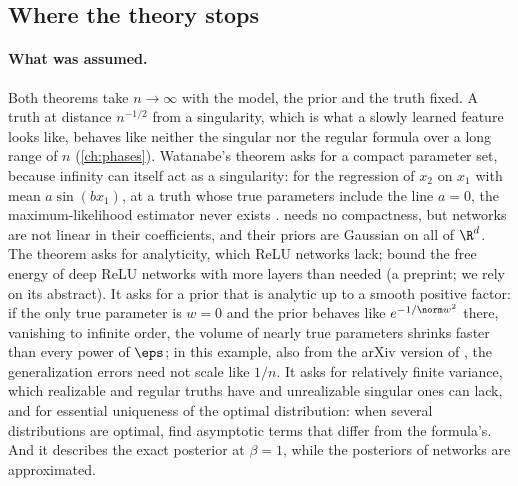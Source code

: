 \begin{refsection}

\section{Where the theory stops}\label{sec:freeenergy:stops}

\paragraph{What was assumed.} Both theorems take $n\to\infty$ with the model, the prior and the truth fixed. A truth at distance $n^{-1/2}$ from a singularity, which is what a slowly learned feature looks like, behaves like neither the singular nor the regular formula over a long range of $n$ (\cref{ch:phases}). Watanabe's theorem asks for a compact parameter set, because infinity can itself act as a singularity: for the regression of $x_2$ on $x_1$ with mean $a\sin(bx_1)$, at a truth whose true parameters include the line $a=0$, the maximum-likelihood estimator never exists \parencite[p.~5 of the arXiv version]{Watanabe2010a}.  needs no compactness, but networks are not linear in their coefficients, and their priors are Gaussian on all of $\R^d$. The theorem asks for analyticity, which ReLU networks lack; \textcite{NagayasuWatanabe2023} bound the free energy of deep ReLU networks with more layers than needed (a preprint; we rely on its abstract). It asks for a prior that is analytic up to a smooth positive factor: if the only true parameter is $w=0$ and the prior behaves like $e^{-1/\norm w^2}$ there, vanishing to infinite order, the volume of nearly true parameters shrinks faster than every power of $\eps$; in this example, also from the arXiv version of \textcite{Watanabe2010a}, the generalization errors need not scale like $1/n$. It asks for relatively finite variance, which realizable and regular truths have and unrealizable singular ones can lack, and for essential uniqueness of the optimal distribution: when several distributions are optimal, \textcite{NagayasuWatanabe2022} find asymptotic terms that differ from the formula's. And it describes the exact posterior at $\beta=1$, while the posteriors of networks are approximated.


\end{refsection}
